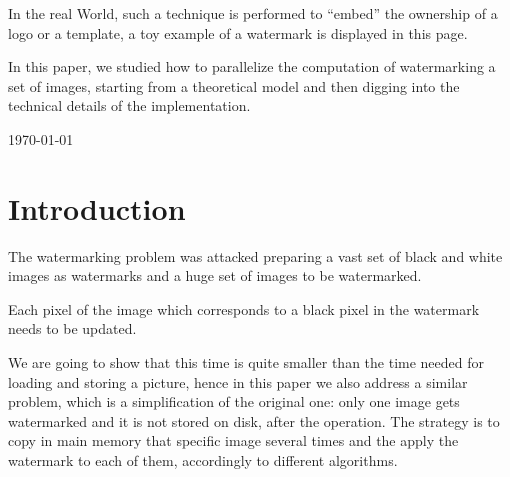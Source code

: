 \documentclass[12pt,a4paper,english]{article}
\begin{document}
\begin{titlepage}
\begin{center}
{In the real World, such a technique is performed to ``embed'' the ownership of a logo or a template, a toy example of a watermark is displayed in this page.

In this paper, we studied how to parallelize the computation of watermarking a set of images, starting from a theoretical model and then digging into the technical details of the implementation.
  }

\vfill
\centering

  \vspace{0.25cm}
  {\large \today}

\end{center}
\end{titlepage}


\tableofcontents
\thispagestyle{empty}
\newpage
\setcounter{page}{1}

\renewcommand{\U}{l}
\newcommand{\I}{h}
\newcommand{\Bkind}[1]{B#1}
\newcommand{\Bn}{\Bkind{N}(\cal{N})}
\newcommand{\Br}{\Bkind{R}}
\newcommand{\Bd}{\Bkind{D}}

\section{Introduction}\label{intro}
The watermarking problem was attacked preparing a vast set of black and white images as watermarks and a huge set of images to be watermarked.

Each pixel of the image which corresponds to a black pixel in the watermark needs to be updated.

We are going to show that this time is quite smaller than the time needed for loading and storing a picture, hence in this paper we also address a similar problem, which is a simplification of the original one: only one image gets watermarked and it is not stored on disk, after the operation. The strategy is to copy in main memory that specific image several times and the apply the watermark to each of them, accordingly to different algorithms.
\end{document}
